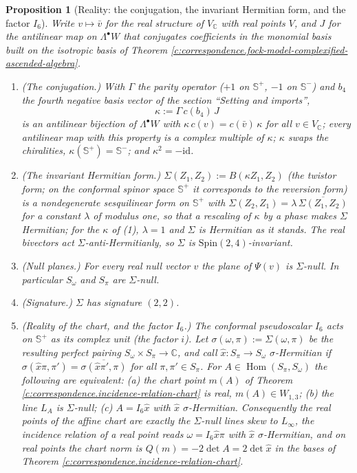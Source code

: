 \documentclass[11pt]{article}
\newtheorem{proposition}[theorem]{Proposition}
\theoremstyle{definition}
\theoremstyle{plain}
\newcommand{\changedmark}[2]{\marginpar{\raggedright\scriptsize\color{#1}#2}}
\providecommand{\C}{}\renewcommand{\C}{\mathbb{C}}
\providecommand{\CS}{}\renewcommand{\CS}{{\mathbb{S}^{+}}}
\providecommand{\CSm}{}\renewcommand{\CSm}{{\mathbb{S}^{-}}}
\providecommand{\Som}{}\renewcommand{\Som}{S_\omega}
\providecommand{\Spi}{}\renewcommand{\Spi}{S_\pi}
\providecommand{\id}{}\renewcommand{\id}{\mathrm{id}}
\begin{document}
\begin{proposition}[Reality: the conjugation, the invariant Hermitian form, and the factor $I_6$]\label{c:correspondence.reality-conjugation-twistor-form-factor}
\changedmark{BurntOrange}{changed since the deposit}
Write $v \mapsto \bar v$ for the real structure of $V_\C$ with real points $V$, and $J$ for the antilinear map on $\Lambda^\bullet W$ that conjugates coefficients in the monomial basis built on the isotropic basis of Theorem \ref{c:correspondence.fock-model-complexified-ascended-algebra}.
\begin{enumerate}
\item (\emph{The conjugation.}) With $\Gamma$ the parity operator ($+1$ on $\CS$, $-1$ on $\CSm$) and $b_4$ the fourth negative basis vector of the section ``Setting and imports'',
\[
\kappa := \Gamma\, c(b_4)\, J
\]
is an antilinear bijection of $\Lambda^\bullet W$ with $\kappa\, c(v) = c(\bar v)\, \kappa$ for all $v \in V_\C$; every antilinear map with this property is a complex multiple of $\kappa$; $\kappa$ swaps the chiralities, $\kappa(\CS) = \CSm$; and $\kappa^2 = -\id$.
\item (\emph{The invariant Hermitian form.}) $\Sigma(Z_1, Z_2) := B(\kappa Z_1, Z_2)$ (the twistor form; on the conformal spinor space $\CS$ it corresponds to the reversion form) is a nondegenerate sesquilinear form on $\CS$ with $\Sigma(Z_2, Z_1) = \lambda\,\overline{\Sigma(Z_1, Z_2)}$ for a constant $\lambda$ of modulus one, so that a rescaling of $\kappa$ by a phase makes $\Sigma$ Hermitian; for the $\kappa$ of (1), $\lambda = 1$ and $\Sigma$ is Hermitian as it stands. The real bivectors act $\Sigma$-anti-Hermitianly, so $\Sigma$ is $\mathrm{Spin}(2,4)$-invariant.
\item (\emph{Null planes.}) For every real null vector $v$ the plane of $\Psi(v)$ is $\Sigma$-null. In particular $\Som$ and $\Spi$ are $\Sigma$-null.
\item (\emph{Signature.}) $\Sigma$ has signature $(2,2)$.
\item (\emph{Reality of the chart, and the factor $I_6$.}) The conformal pseudoscalar $I_6$ acts on $\CS$ as its complex unit (the factor $i$). Let $\sigma(\omega, \pi) := \Sigma(\omega, \pi)$ be the resulting perfect pairing $\Som\times\Spi \to \C$, and call $\hat x: \Spi\to\Som$ \emph{$\sigma$-Hermitian} if $\sigma(\hat x\pi, \pi') = \overline{\sigma(\hat x\pi', \pi)}$ for all $\pi, \pi' \in \Spi$. For $A \in \operatorname{Hom}(\Spi, \Som)$ the following are equivalent: (a) the chart point $m(A)$ of Theorem \ref{c:correspondence.incidence-relation-chart} is real, $m(A) \in W_{1,3}$; (b) the line $L_A$ is $\Sigma$-null; (c) $A = I_6\hat x$ with $\hat x$ $\sigma$-Hermitian. Consequently the real points of the affine chart are exactly the $\Sigma$-null lines skew to $L_\infty$, the incidence relation of a real point reads $\omega = I_6\hat x\pi$ with $\hat x$ $\sigma$-Hermitian, and on real points the chart norm is $Q(m) = -2\det A = 2\det\hat x$ in the bases of Theorem \ref{c:correspondence.incidence-relation-chart}.
\end{enumerate}
\end{proposition}
\end{document}
